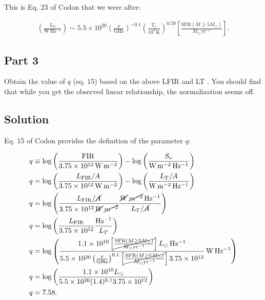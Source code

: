 \documentclass[12pt]{article}
\begin{document}
{\noindent}This is Eq. 23 of Codon that we were after:

\begin{align*}
    \boxed{\left(\frac{L_T}{\mathrm{W\,Hz^{-1}}}\right) \sim 5.5\times10^{20} \left(\frac{\nu}{\mathrm{GHz}}\right)^{-0.1} \left(\frac{T_e}{10^4\,\mathrm{K}}\right)^{0.59} \left[\frac{\mathrm{SFR}(M \geq 5M_\odot)}{M_\odot\,\mathrm{yr^{-1}}}\right]}.
\end{align*}



\subsection*{Part 3}

Obtain the value of $q$ (eq. 15) based on the above LFIR and LT . You should find that while you get the observed linear relationship, the normalization seems off.


\subsection*{Solution}

Eq. 15 of Codon provides the definition of the parameter $q$:

\begin{align*}
    q &\equiv \log \left(\frac{\mathrm{FIR}}{3.75\times10^{12}\,\mathrm{W\,m^{-2}}}\right) - \log \left(\frac{S_\nu}{\mathrm{W\,m^{-2}\,Hz^{-1}}}\right) \\
    q &= \log \left(\frac{L_\mathrm{FIR}/A}{3.75\times10^{12}\,\mathrm{W\,m^{-2}}}\right) - \log \left(\frac{L_T/A}{\mathrm{W\,m^{-2}\,Hz^{-1}}}\right) \\
    q &= \log \left(\frac{L_\mathrm{FIR}/\cancel{A}}{3.75\times10^{12}\,\mathrm{\cancel{W}\,\cancel{m^{-2}}}} \frac{\mathrm{\cancel{W}\,\cancel{m^{-2}}\,Hz^{-1}}}{L_T/\cancel{A}} \right) \\
    q &= \log \left(\frac{L_\mathrm{FIR}}{3.75\times10^{12}} \frac{\mathrm{Hz^{-1}}}{L_T} \right) \\
    q &= \log \left( \frac{1.1\times10^{10} \left[\cancel{\frac{\mathrm{SFR}(M\geq 5M_\odot)}{M_\odot \mathrm{yr^{-1}}}}\right]L_\odot \,\mathrm{Hz^{-1}} }{5.5\times10^{20} \left(\frac{\nu}{\mathrm{GHz}}\right)^{0.1} \left[\cancel{\frac{\mathrm{SFR}(M\geq 5M_\odot)}{M_\odot \mathrm{yr^{-1}}}}\right] 3.75\times10^{12}} \,\mathrm{W\,Hz^{-1}} \right) \\
    q &= \log \left( \frac{1.1\times10^{10} L_\odot }{5.5\times10^{20} (1.4)^{0.1} 3.75\times10^{12}} \right) \\
    q &= 7.58.
\end{align*}
\end{document}

